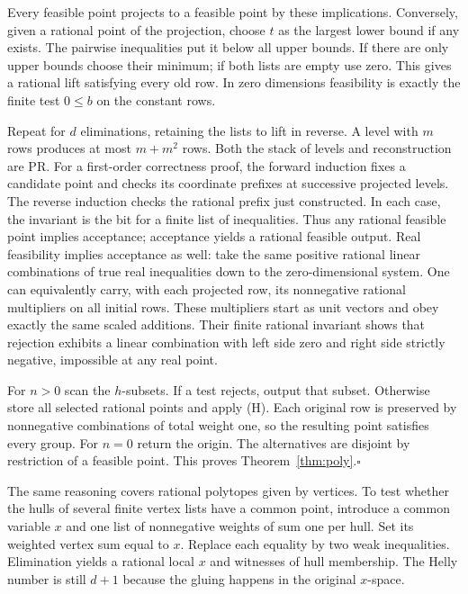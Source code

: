 \documentclass[11pt,letterpaper]{article}
\theoremstyle{packet}\newtheorem{theorem}{Theorem}\newtheorem{lem}[theorem]{Lemma}
\begin{document}
Every feasible point projects to a feasible point by these implications. Conversely, given a rational point of the projection, choose $t$ as the largest lower bound if any exists. The pairwise inequalities put it below all upper bounds. If there are only upper bounds choose their minimum; if both lists are empty use zero. This gives a rational lift satisfying every old row. In zero dimensions feasibility is exactly the finite test $0\le b$ on the constant rows.

Repeat for $d$ eliminations, retaining the lists to lift in reverse. A level with $m$ rows produces at most $m+m^2$ rows. Both the stack of levels and reconstruction are PR. For a first-order correctness proof, the forward induction fixes a candidate point and checks its coordinate prefixes at successive projected levels. The reverse induction checks the rational prefix just constructed. In each case, the invariant is the bit for a finite list of inequalities. Thus any rational feasible point implies acceptance; acceptance yields a rational feasible output. Real feasibility implies acceptance as well: take the same positive rational linear combinations of true real inequalities down to the zero-dimensional system. One can equivalently carry, with each projected row, its nonnegative rational multipliers on all initial rows. These multipliers start as unit vectors and obey exactly the same scaled additions. Their finite rational invariant shows that rejection exhibits a linear combination with left side zero and right side strictly negative, impossible at any real point.

For $n>0$ scan the $h$-subsets. If a test rejects, output that subset. Otherwise store all selected rational points and apply (H). Each original row is preserved by nonnegative combinations of total weight one, so the resulting point satisfies every group. For $n=0$ return the origin. The alternatives are disjoint by restriction of a feasible point. This proves Theorem~\ref{thm:poly}.\hfill$\square$

The same reasoning covers rational polytopes given by vertices. To test whether the hulls of several finite vertex lists have a common point, introduce a common variable $x$ and one list of nonnegative weights of sum one per hull. Set its weighted vertex sum equal to $x$. Replace each equality by two weak inequalities. Elimination yields a rational local $x$ and witnesses of hull membership. The Helly number is still $d+1$ because the gluing happens in the original $x$-space.
\end{document}
